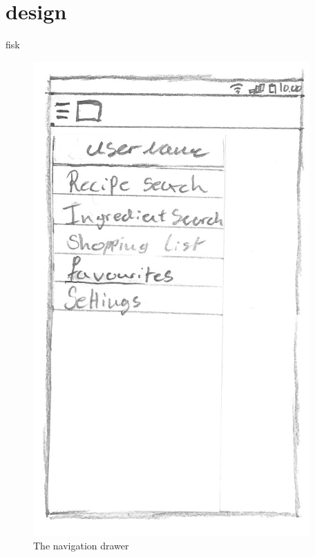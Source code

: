 \section{design}

fisk

\begin{figure}[H]
\begin{minipage}[b]{0.5\columnwidth}
\centering
\includegraphics[width=0.7\columnwidth]{img/prototypes/navigation_drawer.pdf}
\caption{The navigation drawer\label{fig:navdrawer}}
\end{minipage}
\hspace{0.5cm}
\begin{minipage}[b]{0.5\columnwidth}
\centering

\end{minipage}
\end{figure}
